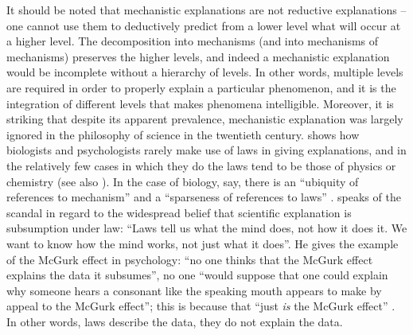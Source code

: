 It should be noted that mechanistic explanations are not reductive explanations – one cannot use them to deductively predict from a lower level what will occur at a higher level. The decomposition into mechanisms (and into mechanisms of mechanisms) preserves the higher levels, and indeed a mechanistic explanation would be incomplete without a hierarchy of levels. In other words, multiple levels are required in order to properly explain a particular phenomenon, and it is the integration of different levels that makes phenomena intelligible. Moreover, it is striking that despite its apparent prevalence, mechanistic explanation was largely ignored in the philosophy of science in the twentieth century. \citet{Bechtel2009} shows how biologists and psychologists rarely make use of laws in giving explanations, and in the relatively few cases in which they do the laws tend to be those of physics or chemistry (see also \citealt{Bechtel2008,BechtelAbrahamsen2005}). In the case of biology, say, there is an “ubiquity of references to mechanism” and a “sparseness of references to laws” \citep[423]{BechtelAbrahamsen2005}. \citet[140]{Cummins2000} speaks of the scandal in regard to the widespread belief that scientific explanation is subsumption under law: “Laws tell us what the mind does, not how it does it. We want to know how the mind works, not just what it does”. He gives the example of the McGurk effect in psychology: “no one thinks that the McGurk effect explains the data it subsumes”, no one “would suppose that one could explain why someone hears a consonant like the speaking mouth appears to make by appeal to the McGurk effect”; this is because that “just \textit{is} the McGurk effect” \citep[119, emphasis in original]{Cummins2000}. In other words, laws describe the data, they do not explain the data. 

